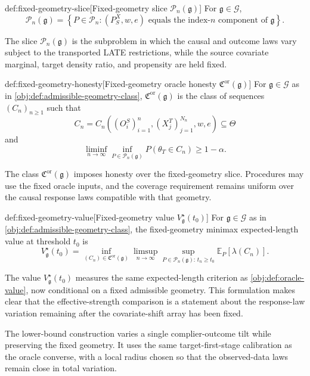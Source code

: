 \begin{definitionv}{def:fixed-geometry-slice}[Fixed-geometry slice \(\mathcal P_n(\mathfrak g)\)]
For \(\mathfrak g\in\mathcal G\),
\[
\mathcal P_n(\mathfrak g)
=
\left\{
P\in\mathcal P_n:
(P_S^X,w,e)\text{ equals the index-}n\text{ component of }\mathfrak g
\right\}.
\]
\end{definitionv}

The slice \(\mathcal P_n(\mathfrak g)\) is the subproblem in which the causal and outcome laws vary subject to the transported LATE restrictions, while the source covariate marginal, target density ratio, and propensity are held fixed.

\begin{definitionv}{def:fixed-geometry-honesty}[Fixed-geometry oracle honesty \(\mathfrak C^{\mathrm{or}}(\mathfrak g)\)]
For \(\mathfrak g\in\mathcal G\) as in \cref{obj:def:admissible-geometry-class}, \(\mathfrak C^{\mathrm{or}}(\mathfrak g)\) is the class of sequences \((C_n)_{n\ge1}\) such that
\[
C_n
=
C_n\!\left((O_i^S)_{i=1}^n,(X_j^T)_{j=1}^{N_n},w,e\right)
\subseteq \Theta
\]
and
\[
\liminf_{n\to\infty}
\inf_{P\in\mathcal P_n(\mathfrak g)}
P(\theta_T\in C_n)
\ge 1-\alpha .
\]
\end{definitionv}

The class \(\mathfrak C^{\mathrm{or}}(\mathfrak g)\) imposes honesty over the fixed-geometry slice.  Procedures may use the fixed oracle inputs, and the coverage requirement remains uniform over the causal response laws compatible with that geometry.

\begin{definitionv}{def:fixed-geometry-value}[Fixed-geometry value \(V_{\mathfrak g}^\star(t_0)\)]
For \(\mathfrak g\in\mathcal G\) as in \cref{obj:def:admissible-geometry-class}, the fixed-geometry minimax expected-length value at threshold \(t_0\) is
\[
V_{\mathfrak g}^\star(t_0)
=
\inf_{(C_n)\in\mathfrak C^{\mathrm{or}}(\mathfrak g)}
\limsup_{n\to\infty}
\sup_{P\in\mathcal P_n(\mathfrak g):\,t_n\ge t_0}
\mathbb E_P[\lambda(C_n)] .
\]
\end{definitionv}

The value \(V_{\mathfrak g}^\star(t_0)\) measures the same expected-length criterion as \cref{obj:def:oracle-value}, now conditional on a fixed admissible geometry.  This formulation makes clear that the effective-strength comparison is a statement about the response-law variation remaining after the covariate-shift array has been fixed.

The lower-bound construction varies a single complier-outcome tilt while preserving the fixed geometry.  It uses the same target-first-stage calibration as the oracle converse, with a local radius chosen so that the observed-data laws remain close in total variation.

